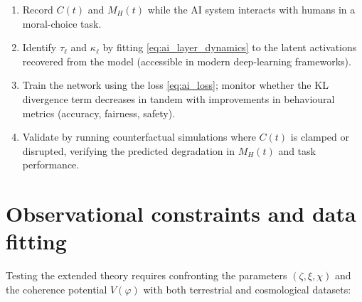 \documentclass[12pt,a4paper]{article}
\theoremstyle{definition}
\begin{document}
\begin{enumerate}
    \item Record $C(t)$ and $M_H(t)$ while the AI system interacts with humans in a moral-choice task.
    \item Identify $\tau_\ell$ and $\kappa_\ell$ by fitting \eqref{eq:ai_layer_dynamics} to the latent activations recovered from the model (accessible in modern deep-learning frameworks).
    \item Train the network using the loss \eqref{eq:ai_loss}; monitor whether the KL divergence term decreases in tandem with improvements in behavioural metrics (accuracy, fairness, safety).
    \item Validate by running counterfactual simulations where $C(t)$ is clamped or disrupted, verifying the predicted degradation in $M_H(t)$ and task performance.
\end{enumerate}

\section{Observational constraints and data fitting}

Testing the extended theory requires confronting the parameters $(\zeta,\xi,\chi)$ and the coherence potential $V(\varphi)$ with both terrestrial and cosmological datasets:
\end{document}
